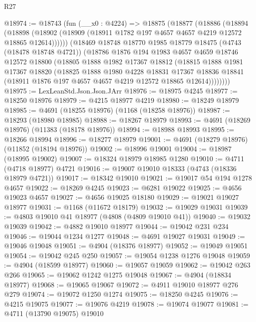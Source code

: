 \begin{lexlean}{R27}
\begin{coremodule}
@18974 := @18743
    (fun (__x0 : @4224) =>
    @18875
      (@18877
        (@18886
          (@18894
            (@18898 (@18902 (@18909 (@18911 @1782 @197 @4657 @4657 @4219 @12572 @18865 @12614))))))
        (@18469
          @18748
          @18770
          @1985
          @18779
          @18475
          (@4743 (@18478 @18748 @4721))
          (@18786
            @1876
            @194
            @1983
            @4657
            @4659
            @18746
            @12572
            @18800
            (@18805
              @1888
              @1982
              @17367
              @18812
              (@18815
                @1888
                @1981
                @17367
                @18820
                (@18825
                  @1888
                  @1980
                  @4228
                  @18831
                  @17367
                  @18836
                  @18841
                  (@18911 @1876 @197 @4657 @4657 @4219 @12572 @18865 @12614))))))))
@18975 := LexLeanStd.Json.Json.JArr
@18976 := @18975 @4245
@18977 := @18250 @18976
@18979 := @4215 @18977 @4219
@18980 := @18249 @18979
@18985 := @4691 (@18255 @18976) (@1168 (@18258 @18976))
@18987 := @18293 (@18980 @18985)
@18988 := @18267 @18979
@18993 := @4691 (@18269 @18976) (@11383 (@18178 @18976))
@18994 := @18988 @18993
@18995 := @18266 @18994
@18996 := @18277 @18979
@19001 := @4691 (@18279 @18976) (@11852 (@18194 @18976))
@19002 := @18996 @19001
@19004 := @18987 (@18995 @19002)
@19007 := @18324 @18979 @18985 @1280
@19010 := @4711 (@4718 @18977) @4721
@19016 := @19007 @19010 @18333 (@4743 (@18336 @18979 @4721))
@19017 := @18342 @19010
@19021 := @19017 @54 @194 @1278 @4657
@19022 := @18269 @4245
@19023 := @6281 @19022
@19025 := @4656 @19023 @4657
@19027 := @4656 @19025 @18180
@19029 := @19021 @19027 @18977
@19031 := @1168 (@11672 @18179)
@19032 := @19029 @19031
@19039 := @4803 @19010 @41 @18977 (@4808 (@4809 @19010 @41))
@19040 := @19032 @19039
@19042 := @4882 @19010 @18977
@19044 := @19042 @231 @234
@19046 := @19044 @1234 @1277
@19048 := @4691 @19027 @19031
@19049 := @19046 @19048
@19051 := @4904 (@18376 @18977)
@19052 := @19049 @19051
@19054 := @19042 @245 @250
@19057 := @19054 @1238 @1276 @19048
@19059 := @4904 (@18599 @18977)
@19060 := @19057 @19059
@19062 := @19042 @263 @266
@19065 := @19062 @1242 @1275 @19048
@19067 := @4904 (@18834 @18977)
@19068 := @19065 @19067
@19072 := @4911 @19010 @18977 @276 @279
@19074 := @19072 @1250 @1274
@19075 := @18250 @4245
@19076 := @4215 @19075
@19077 := @19076 @4219
@19078 := @19074 @19077
@19081 := @4711 (@13790 @19075) @19010

\end{coremodule}
\end{lexlean}
